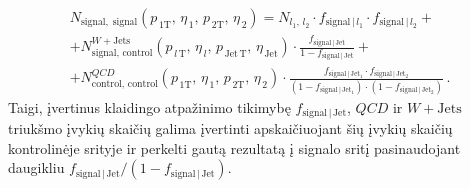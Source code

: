 \documentclass[a4paper, 12pt, oneside]{article}
\newcommand{\WJets}{W\! +\!\mathrm{Jets}}
\newcommand{\QCD}{QC\! D}
\newlength\q
\begin{document}
\begin{multline}
	\label{eq:FRapply}
	N_{\mathrm{signal, \; signal}}(p_{\, 1\mathrm{T}}, \, \eta_{\, 1}, \, p_{\, 2\mathrm{T}}, \, \eta_{\, 2}) =
	N_{l_1, \, l_2} \cdot 
	f_{\mathrm{signal} \,| \,l_1} \cdot f_{\mathrm{signal} \,| \, l_2} + \\[5pt] +
	N^{\WJets}_{\mathrm{signal, \, control}}(p_{\, l\,\mathrm{T}}, \, \eta_{\, l}, \, p_{\mathrm{\, Jet\,T}}, \, \eta_{\,\mathrm{Jet}}) \cdot
	\frac{f_{\mathrm{signal} \,| \, \mathrm{Jet}}}
	{1 - f_{\mathrm{signal} \,| \, \mathrm{Jet}}} + \\[5pt] +
	N^{\QCD}_{\mathrm{control, \, control}}(p_{\, 1\mathrm{T}}, \, \eta_{\, 1}, \, p_{\, 2\mathrm{T}}, \, \eta_{\, 2}) \cdot
	\frac{f_{\mathrm{signal} \,| \,\mathrm{Jet_1}}\cdot
	f_{\mathrm{signal} \,| \,\mathrm{Jet_2}}}
	{\left(1-f_{\mathrm{signal} \,| \,\mathrm{Jet_1}}\right) \cdot
	\left(1-f_{\mathrm{signal} \,| \,\mathrm{Jet_2}}\right)}\, .
\end{multline}
Taigi, įvertinus klaidingo atpažinimo tikimybę $f_{\mathrm{signal} \,| \,\mathrm{Jet}}$, $QCD$ ir
$\WJets$ triukšmo įvykių skaičių galima įvertinti apskaičiuojant šių įvykių skaičių kontrolinėje srityje ir perkelti gautą rezultatą į
signalo sritį pasinaudojant daugikliu $f_{\mathrm{signal} \,| \,\mathrm{Jet}}/(1-f_{\mathrm{signal} \,| \,\mathrm{Jet}})$.
\end{document}
